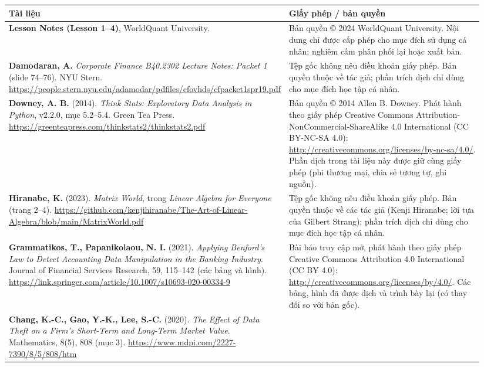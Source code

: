 {\small
\renewcommand{\arraystretch}{1.25}
\begin{longtable}{>{\raggedright\arraybackslash}p{0.34\linewidth}>{\raggedright\arraybackslash}p{0.60\linewidth}}
\toprule
\textbf{Tài liệu} & \textbf{Giấy phép / bản quyền} \\
\midrule
\endhead
\textbf{Lesson Notes (Lesson 1--4)}, WorldQuant University. &
Bản quyền © 2024 WorldQuant University. Nội dung chỉ được cấp phép cho mục đích sử dụng cá nhân; nghiêm cấm phân phối lại hoặc xuất bản. \\
\addlinespace
\textbf{Damodaran, A.} \emph{Corporate Finance B40.2302 Lecture Notes: Packet 1} (slide 74--76). NYU Stern. \url{https://people.stern.nyu.edu/adamodar/pdfiles/cfovhds/cfpacket1spr19.pdf} &
Tệp gốc không nêu điều khoản giấy phép. Bản quyền thuộc về tác giả; phần trích dịch chỉ dùng cho mục đích học tập cá nhân. \\
\addlinespace
\textbf{Downey, A. B.} (2014). \emph{Think Stats: Exploratory Data Analysis in Python}, v2.2.0, mục 5.2--5.4. Green Tea Press. \url{https://greenteapress.com/thinkstats2/thinkstats2.pdf} &
Bản quyền © 2014 Allen B. Downey. Phát hành theo giấy phép Creative Commons Attribution-NonCommercial-ShareAlike 4.0 International (CC BY-NC-SA 4.0): \url{http://creativecommons.org/licenses/by-nc-sa/4.0/}. Phần dịch trong tài liệu này được giữ cùng giấy phép (phi thương mại, chia sẻ tương tự, ghi nguồn). \\
\addlinespace
\textbf{Hiranabe, K.} (2023). \emph{Matrix World}, trong \emph{Linear Algebra for Everyone} (trang 2--4). \url{https://github.com/kenjihiranabe/The-Art-of-Linear-Algebra/blob/main/MatrixWorld.pdf} &
Tệp gốc không nêu điều khoản giấy phép. Bản quyền thuộc về các tác giả (Kenji Hiranabe; lời tựa của Gilbert Strang); phần trích dịch chỉ dùng cho mục đích học tập cá nhân. \\
\addlinespace
\textbf{Grammatikos, T., Papanikolaou, N. I.} (2021). \emph{Applying Benford's Law to Detect Accounting Data Manipulation in the Banking Industry}. Journal of Financial Services Research, 59, 115--142 (các bảng và hình). \url{https://link.springer.com/article/10.1007/s10693-020-00334-9} &
Bài báo truy cập mở, phát hành theo giấy phép Creative Commons Attribution 4.0 International (CC BY 4.0): \url{http://creativecommons.org/licenses/by/4.0/}. Các bảng, hình đã được dịch và trình bày lại (có thay đổi so với bản gốc). \\
\addlinespace
\textbf{Chang, K.-C., Gao, Y.-K., Lee, S.-C.} (2020). \emph{The Effect of Data Theft on a Firm's Short-Term and Long-Term Market Value}. Mathematics, 8(5), 808 (mục 3). \url{https://www.mdpi.com/2227-7390/8/5/808/htm} &

\end{longtable}}
